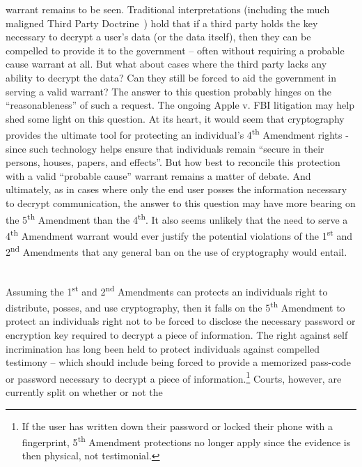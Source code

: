 \begin{packed_desc}
  warrant remains to be seen. Traditional interpretations (including
  the much maligned Third Party Doctrine~\cite{thompson-thirdparty})
  hold that if a third party holds the key necessary to decrypt a
  user's data (or the data itself), then they can be compelled to
  provide it to the government -- often without requiring a probable
  cause warrant at all. But what about cases where the third party
  lacks any ability to decrypt the data? Can they still be forced to
  aid the government in serving a valid warrant?  The answer to this
  question probably hinges on the ``reasonableness'' of such a
  request. The ongoing Apple v. FBI litigation may help shed some
  light on this question. At its heart, it would seem that
  cryptography provides the ultimate tool for protecting an
  individual's 4\textsuperscript{th} Amendment rights - since such
  technology helps ensure that individuals remain ``secure in their
  persons, houses, papers, and effects''. But how best to reconcile
  this protection with a valid ``probable cause'' warrant remains a
  matter of debate. And ultimately, as in cases where only the end
  user posses the information necessary to decrypt communication, the
  answer to this question may have more bearing on the
  5\textsuperscript{th} Amendment than the 4\textsuperscript{th}.  It
  also seems unlikely that the need to serve a 4\textsuperscript{th}
  Amendment warrant would ever justify the potential violations of the
  1\textsuperscript{st} and 2\textsuperscript{nd} Amendments that any
  general ban on the use of cryptography would entail.
\item[5\textsuperscript{th} Amendment] \hfill \\ Assuming the
  1\textsuperscript{st} and 2\textsuperscript{nd} Amendments can
  protects an individuals right to distribute, posses, and use
  cryptography, then it falls on the 5\textsuperscript{th} Amendment
  to protect an individuals right not to be forced to disclose the
  necessary password or encryption key required to decrypt a piece of
  information. The right against self incrimination has long been held
  to protect individuals against compelled testimony -- which should
  include being forced to provide a memorized pass-code or password
  necessary to decrypt a piece of information.\footnote{If the user
    has written down their password or locked their phone with a
    fingerprint, 5\textsuperscript{th} Amendment protections no longer
    apply since the evidence is then physical, not testimonial.}
  Courts, however, are currently split on whether or not the

\end{packed_desc}
